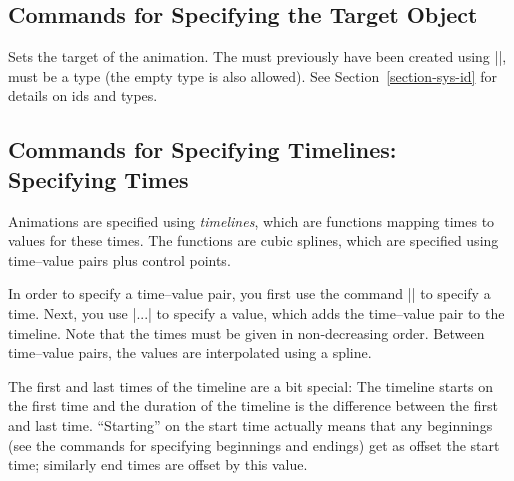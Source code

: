 \subsection{Commands for Specifying the Target Object}

\begin{command}{\pgfsysanimkeywhom{}}
\end{command}
%
\begin{command}{\pgfsys@animation@whom{}}
    Sets the target of the animation. The  must previously have been
    created using |\pgfsys@new@id|,  must be a type (the empty type
    is also allowed). See Section~\ref{section-sys-id} for details on ids and
    types.
\end{command}


\subsection{Commands for Specifying Timelines: Specifying Times}

Animations are specified using \emph{timelines}, which are functions mapping
times to values for these times. The functions are cubic splines, which are
specified using time--value pairs plus control points.

In order to specify a time--value pair, you first use the command
|\pgfsysanimkeytime| to specify a time. Next, you use |\pgfsysanimval...| to
specify a value, which adds the time--value pair to the timeline. Note that the
times must be given in non-decreasing order. Between time--value pairs, the
values are interpolated using a spline.

The first and last times of the timeline are a bit special: The timeline starts
on the first time and the duration of the timeline is the difference between
the first and last time. ``Starting'' on the start time actually means that any
beginnings (see the commands for specifying beginnings and endings) get as
offset the start time; similarly end times are offset by this value.

